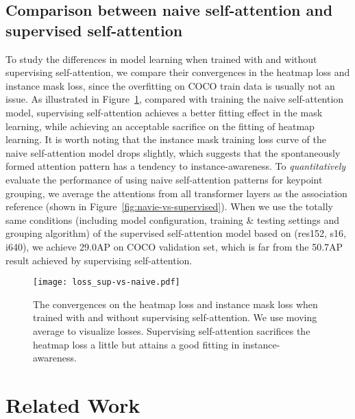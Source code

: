 \documentclass{article} \usepackage{iclr_conference,times}
\begin{document}
\subsection{Comparison between naive self-attention and supervised self-attention}

To study the differences in model learning when trained with and without supervising self-attention, we compare their convergences in the heatmap loss and instance mask loss, since the overfitting on COCO train data is usually not an issue.
As illustrated in Figure~\ref{fig:sup-vs-naive}, compared with training the naive self-attention model, supervising self-attention achieves a better fitting effect in the mask learning, while achieving an acceptable sacrifice on the fitting of heatmap learning. 
It is worth noting that the instance mask training loss curve of the naive self-attention model drops slightly, which suggests that the spontaneously formed attention pattern has a tendency to instance-awareness. 
To \textit{quantitatively} evaluate the performance of using naive self-attention patterns for keypoint grouping, we average the attentions from all transformer layers as the association reference (shown in Figure~\ref{fig:navie-vs-supervised}). When we use the totally same conditions (including model configuration, training \& testing settings and grouping algorithm) of the supervised self-attention model based on (res152, s16, i640), we achieve 29.0AP on COCO validation set, which is far from the 50.7AP result achieved by supervising self-attention. 


\begin{figure}
\begin{center}
	\texttt{[image: loss\_sup-vs-naive.pdf]}
\end{center}
\caption{The convergences on the heatmap loss and instance mask loss when trained with and without supervising self-attention. We use moving average to visualize losses. Supervising self-attention sacrifices the heatmap loss a little but attains a good fitting in instance-awareness.}
\label{fig:sup-vs-naive}
\end{figure}

\section{Related Work}
\end{document}
